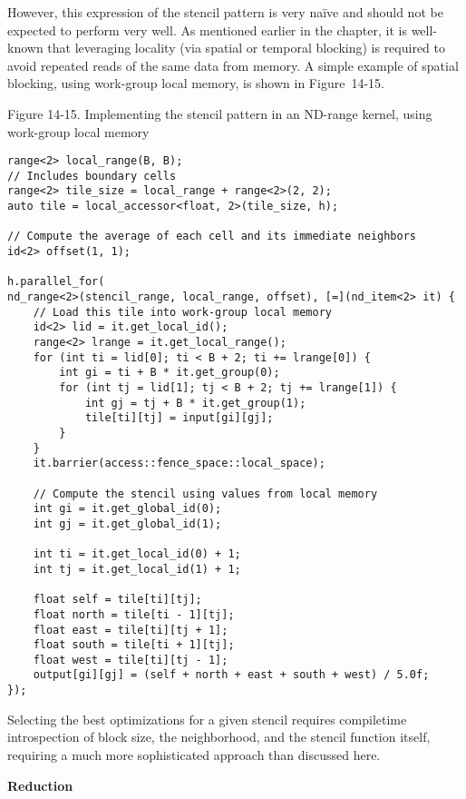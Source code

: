 However, this expression of the stencil pattern is very naïve and should not be expected to perform very well. As mentioned earlier in the chapter, it is well-known that leveraging locality (via spatial or temporal blocking) is required to avoid repeated reads of the same data from memory. A simple example of spatial blocking, using work-group local memory, is shown in Figure 14-15.\par

\hspace*{\fill} \par %
Figure 14-15. Implementing the stencil pattern in an ND-range kernel, using work-group local memory
\begin{lstlisting}[caption={}]
range<2> local_range(B, B);
// Includes boundary cells
range<2> tile_size = local_range + range<2>(2, 2);
auto tile = local_accessor<float, 2>(tile_size, h);

// Compute the average of each cell and its immediate neighbors
id<2> offset(1, 1);

h.parallel_for(
nd_range<2>(stencil_range, local_range, offset), [=](nd_item<2> it) {
	// Load this tile into work-group local memory
	id<2> lid = it.get_local_id();
	range<2> lrange = it.get_local_range();
	for (int ti = lid[0]; ti < B + 2; ti += lrange[0]) {
		int gi = ti + B * it.get_group(0);
		for (int tj = lid[1]; tj < B + 2; tj += lrange[1]) {
			int gj = tj + B * it.get_group(1);
			tile[ti][tj] = input[gi][gj];
		}
	}
	it.barrier(access::fence_space::local_space);
	
	// Compute the stencil using values from local memory
	int gi = it.get_global_id(0);
	int gj = it.get_global_id(1);
	
	int ti = it.get_local_id(0) + 1;
	int tj = it.get_local_id(1) + 1;
	
	float self = tile[ti][tj];
	float north = tile[ti - 1][tj];
	float east = tile[ti][tj + 1];
	float south = tile[ti + 1][tj];
	float west = tile[ti][tj - 1];
	output[gi][gj] = (self + north + east + south + west) / 5.0f;
});
\end{lstlisting}

Selecting the best optimizations for a given stencil requires compiletime introspection of block size, the neighborhood, and the stencil function itself, requiring a much more sophisticated approach than discussed here.\par

\hspace*{\fill} \par %
\textbf{Reduction}

